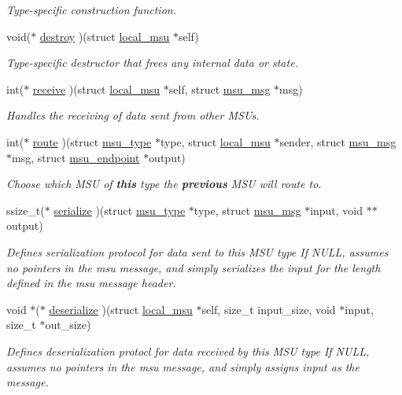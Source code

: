 \begin{DoxyCompactItemize}
\begin{DoxyCompactList}\small\item\em Type-\/specific construction function. \end{DoxyCompactList}\item 
void($\ast$ \hyperlink{structmsu__type_abfe698dd8e2d5ff6107f843c93927710}{destroy} )(struct \hyperlink{structlocal__msu}{local\-\_\-msu} $\ast$self)
\begin{DoxyCompactList}\small\item\em Type-\/specific destructor that frees any internal data or state. \end{DoxyCompactList}\item 
int($\ast$ \hyperlink{structmsu__type_a8e80deeae69a39533061d4407fa7c53d}{receive} )(struct \hyperlink{structlocal__msu}{local\-\_\-msu} $\ast$self, struct \hyperlink{structmsu__msg}{msu\-\_\-msg} $\ast$msg)
\begin{DoxyCompactList}\small\item\em Handles the receiving of data sent from other M\-S\-Us. \end{DoxyCompactList}\item 
int($\ast$ \hyperlink{structmsu__type_ab076ecc00c1838c66351f51f9f2b684e}{route} )(struct \hyperlink{structmsu__type}{msu\-\_\-type} $\ast$type, struct \hyperlink{structlocal__msu}{local\-\_\-msu} $\ast$sender, struct \hyperlink{structmsu__msg}{msu\-\_\-msg} $\ast$msg, struct \hyperlink{structmsu__endpoint}{msu\-\_\-endpoint} $\ast$output)
\begin{DoxyCompactList}\small\item\em Choose which M\-S\-U of {\bfseries this} type the {\bfseries previous} M\-S\-U will route to. \end{DoxyCompactList}\item 
ssize\-\_\-t($\ast$ \hyperlink{structmsu__type_a6be267e2e9d55fdd344607964a058f78}{serialize} )(struct \hyperlink{structmsu__type}{msu\-\_\-type} $\ast$type, struct \hyperlink{structmsu__msg}{msu\-\_\-msg} $\ast$input, void $\ast$$\ast$output)
\begin{DoxyCompactList}\small\item\em Defines serialization protocol for data sent to this M\-S\-U type If N\-U\-L\-L, assumes no pointers in the msu message, and simply serializes the input for the length defined in the msu message header. \end{DoxyCompactList}\item 
void $\ast$($\ast$ \hyperlink{structmsu__type_aac8405708b7ec84ec3ba5d7d7d2042ab}{deserialize} )(struct \hyperlink{structlocal__msu}{local\-\_\-msu} $\ast$self, size\-\_\-t input\-\_\-size, void $\ast$input, size\-\_\-t $\ast$out\-\_\-size)
\begin{DoxyCompactList}\small\item\em Defines deserialization protocl for data received by this M\-S\-U type If N\-U\-L\-L, assumes no pointers in the msu message, and simply assigns {\ttfamily input} as the message. \end{DoxyCompactList}\end{DoxyCompactItemize}


